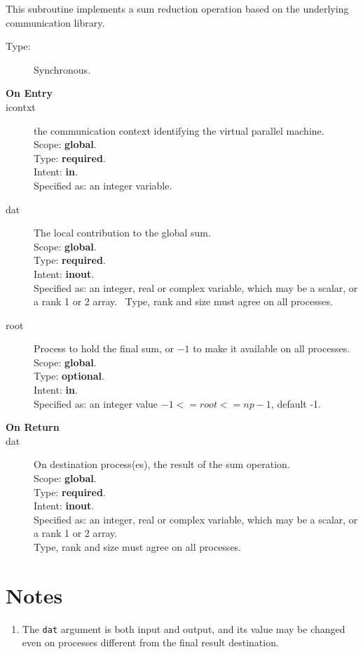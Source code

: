 

This subroutine implements a sum reduction  operation based on the
underlying communication library. 
\begin{description}
\item[Type:] Synchronous.
\item[\bf  On Entry ]
\item[icontxt] the communication context identifying the virtual
  parallel machine.\\
Scope: {\bf global}.\\
Type: {\bf required}.\\
Intent: {\bf in}.\\
Specified as: an integer variable.
\item[dat] The local contribution to the global sum.\\
Scope: {\bf global}.\\
Type: {\bf required}.\\
Intent: {\bf inout}.\\
Specified as: an integer, real or complex variable, which may be a
scalar, or a rank 1 or 2 array. \
Type, rank and size must agree on all processes.
\item[root] Process to hold the final sum, or $-1$ to make it available
  on all processes.\\
Scope: {\bf global}.\\
Type: {\bf optional}.\\
Intent: {\bf in}.\\
Specified as: an integer value $-1<= root <= np-1$, default -1. \
\end{description}


\begin{description}
\item[\bf On Return]
\item[dat] On destination process(es), the result of the sum operation.\\
Scope: {\bf global}.\\
Type: {\bf required}.\\
Intent: {\bf inout}.\\
Specified as: an integer, real or complex variable, which may be a
scalar, or a rank 1 or 2 array. \\
Type, rank and size must agree on all processes.
\end{description}

\section*{Notes}
\begin{enumerate}
\item The \verb|dat| argument is both input and output, and its
  value may be changed even on processes different from the final
  result destination.
\end{enumerate}



